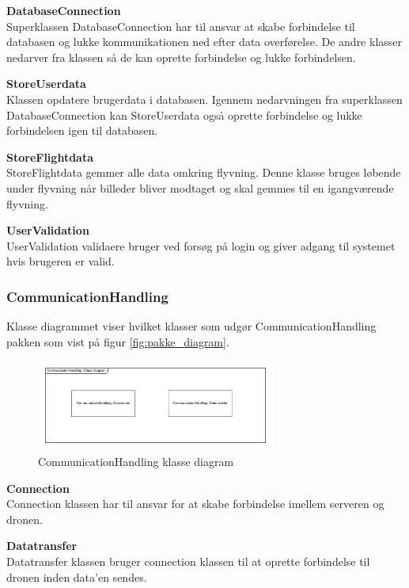 \textbf{DatabaseConnection}\\
Superklassen DatabaseConnection har til ansvar at skabe forbindelse til databasen og lukke kommunikationen ned efter data overførelse. De andre klasser nedarver fra klassen så de kan oprette forbindelse og lukke forbindelsen.

\textbf{StoreUserdata}\\
Klassen opdatere brugerdata i databasen. Igennem nedarvningen fra superklassen DatabaseConnection kan StoreUserdata også oprette forbindelse og lukke forbindelsen igen til databasen.

\textbf{StoreFlightdata}\\
StoreFlightdata gemmer alle data omkring flyvning. Denne klasse bruges løbende under flyvning når billeder bliver modtaget og skal gemmes til en igangværende flyvning.

\textbf{UserValidation}\\
UserValidation validaere bruger ved forsøg på login og giver adgang til systemet hvis brugeren er valid.

\newpage
\subsubsection{CommunicationHandling}
Klasse diagrammet viser hvilket klasser som udgør CommunicationHandling pakken som vist på figur \ref{fig:pakke_diagram}.

\vspace{-5pt}
\begin{figure}[H]
	\centering
	\includegraphics[width=0.7\textwidth]{Billeder/klasse_diagrammer/CommunicationHandling.png}
	\vspace{-5pt}
	\caption{CommunicationHandling klasse diagram}
	\label{fig:CommunicationHandling_klasse_diagram}
\end{figure}

\textbf{Connection}\\
Connection klassen har til ansvar for at skabe forbindelse imellem serveren og dronen.

\textbf{Datatransfer}\\
Datatransfer klassen bruger connection klassen til at oprette forbindelse til dronen inden data'en sendes. 
